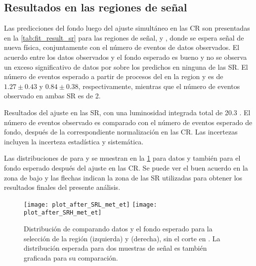 




\subsection{Resultados en las regiones de señal}

Las predicciones del fondo luego del ajuste simultáneo en las CR son presentadas
en la \cref{tab:fit_result_sr} para las regiones de señal, {\SRL} y {\SRH}, donde
se espera señal de nueva física,
conjuntamente con el número de eventos de datos observados. El acuerdo entre los
datos observados y el fondo esperado es bueno y no se observa un exceso
significativo de datos por sobre los predichos en ninguna de las SR.
El número de eventos esperado a partir de procesos del {\SM}  en la region {\SRL} y
{\SRH} es de $1.27\pm0.43$ y $0.84\pm0.38$, respectivamente, mientras que el
número de eventos observado en ambas SR es de 2.

\begin{table}[!htbp]
  \centering

  \caption{Resultados del ajuste en las SR, con una luminosidad integrada total
    de 20.3 \ifb. El número de eventos observado es comparado con el número de
    eventos esperado de fondo, después de la correspondiente normalización en
    las CR. Las incertezas incluyen la incerteza estadística y sistemática.}
  \label{tab:fit_result_sr}

  

\end{table}


Las distribuciones de {\met} para {\SRL} y {\SRH} se muestran en la
\cref{fig:met_sr} para datos y también para el fondo esperado después del
ajuste en las CR. Se puede ver el buen acuerdo en la zona de bajo {\met} y las
flechas indican la zona de las SR utilizadas para obtener los resultados finales
del presente análisis.

\begin{figure}[!htbp]

  \centering

  \texttt{[image: plot\_after\_SRL\_met\_et]}
  \texttt{[image: plot\_after\_SRH\_met\_et]}

  \caption{Distribución de {\met} comparando datos y el fondo esperado para la
    selección de la región {\SRL} (izquierda) y {\SRH} (derecha), sin el corte
    en {\met}. La distribución esperada para dos muestras de señal es también
    graficada para su comparación.}
  \label{fig:met_sr}

\end{figure}



